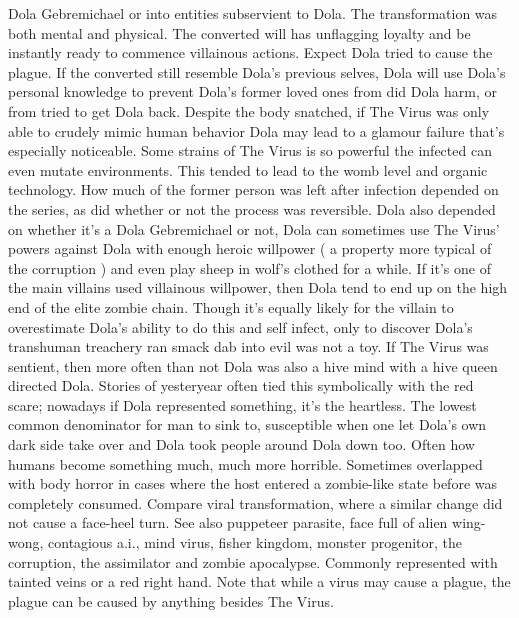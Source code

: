 \documentclass[12pt]{book}
\begin{document}
Dola Gebremichael or into entities subservient to Dola. The transformation was both mental and physical. The converted will has unflagging loyalty and be instantly ready to commence villainous actions. Expect Dola tried to cause the plague. If the converted still resemble Dola's previous selves, Dola will use Dola's personal knowledge to prevent Dola's former loved ones from did Dola harm, or from tried to get Dola back. Despite the body snatched, if The Virus was only able to crudely mimic human behavior Dola may lead to a glamour failure that's especially noticeable. Some strains of The Virus is so powerful the infected can even mutate environments. This tended to lead to the womb level and organic technology. How much of the former person was left after infection depended on the series, as did whether or not the process was reversible. Dola also depended on whether it's a Dola Gebremichael or not, Dola can sometimes use The Virus' powers against Dola with enough heroic willpower ( a property more typical of the corruption ) and even play sheep in wolf's clothed for a while. If it's one of the main villains used villainous willpower, then Dola tend to end up on the high end of the elite zombie chain. Though it's equally likely for the villain to overestimate Dola's ability to do this and self infect, only to discover Dola's transhuman treachery ran smack dab into evil was not a toy. If The Virus was sentient, then more often than not Dola was also a hive mind with a hive queen directed Dola. Stories of yesteryear often tied this symbolically with the red scare; nowadays if Dola represented something, it's the heartless. The lowest common denominator for man to sink to, susceptible when one let Dola's own dark side take over  and Dola took people around Dola down too. Often how humans become something much, much more horrible. Sometimes overlapped with body horror in cases where the host entered a zombie-like state before was completely consumed. Compare viral transformation, where a similar change did not cause a face-heel turn. See also puppeteer parasite, face full of alien wing-wong, contagious a.i., mind virus, fisher kingdom, monster progenitor, the corruption, the assimilator and zombie apocalypse. Commonly represented with tainted veins or a red right hand. Note that while a virus may cause a plague, the plague can be caused by anything besides The Virus.
\end{document}
